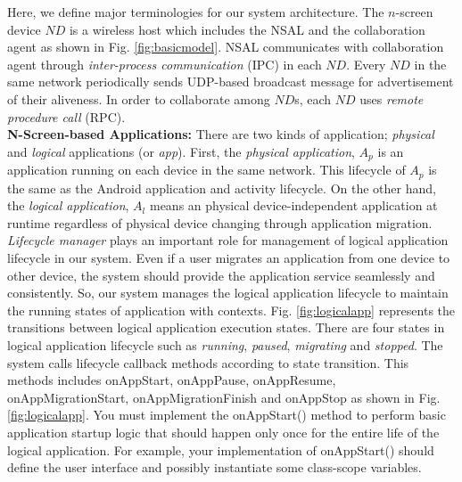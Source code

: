 \documentclass[conference]{IEEEtran}
\begin{document}

Here, we define major terminologies for our system architecture. The $n$-screen device $ND$ is a wireless host which includes the NSAL and the collaboration agent as shown in Fig. \ref{fig:basicmodel}. NSAL communicates with collaboration agent through \textit{inter-process communication} (IPC) in each $ND$.  Every $ND$ in the same network periodically sends UDP-based broadcast message for advertisement of their aliveness.
In order to collaborate among $ND$s, each $ND$ uses \textit{remote procedure call} (RPC).
\\

\noindent
\textbf{N-Screen-based Applications: }
There are two kinds of application; \textit{physical} and \textit{logical} applications (or \textit{app}).
First, the \textit{physical application}, $A_p$ is an application running on each device in the same network.  
This lifecycle of  $A_p$ is the same as the Android application and activity lifecycle.
On the other hand, the \textit{logical application}, $A_l$ means an physical device-independent application at runtime regardless of physical device changing through application migration.
\textit{Lifecycle manager} plays an important role for management of logical application lifecycle in our system.
Even if a user migrates an application from one device to other device, 
the system should provide the application service  seamlessly and consistently. 
So, our system manages the logical application lifecycle to maintain the running states of application with contexts.
Fig. \ref{fig:logicalapp} represents the transitions between logical application execution states. There are four states in logical application lifecycle such as \textit{running}, \textit{paused}, \textit{migrating} and \textit{stopped}. The system calls lifecycle callback methods according to state transition. This methods includes {\small \sffamily onAppStart, onAppPause, onAppResume, onAppMigrationStart, onAppMigrationFinish} and {\small \sffamily onAppStop} as shown in Fig. \ref{fig:logicalapp}.
You must implement the {\small \sffamily onAppStart()} method to perform basic application startup logic that should happen only once for the entire life of the logical application. For example, your implementation of {\small \sffamily onAppStart()} should define the user interface and possibly instantiate some class-scope variables.
\end{document}
